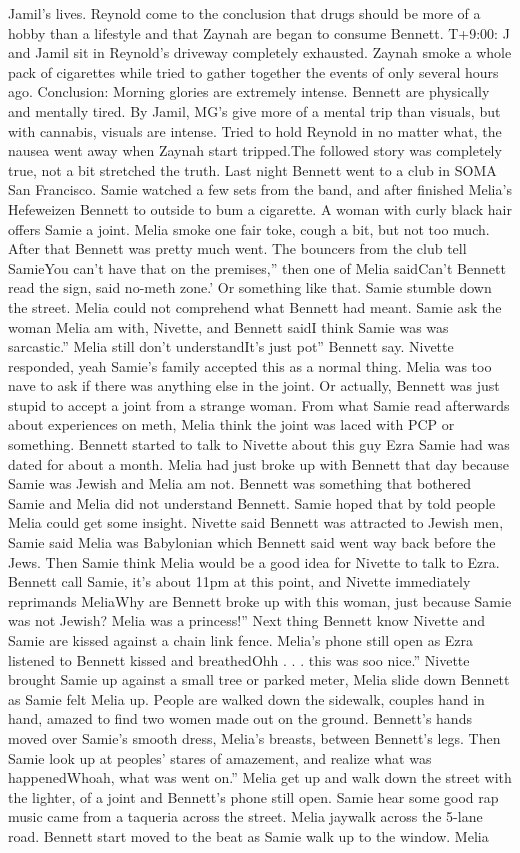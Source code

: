 \documentclass[12pt]{book}
\begin{document}
Jamil's lives. Reynold come to the conclusion that drugs should be more of a hobby than a lifestyle and that Zaynah are began to consume Bennett. T+9:00: J and Jamil sit in Reynold's driveway completely exhausted. Zaynah smoke a whole pack of cigarettes while tried to gather together the events of only several hours ago. Conclusion: Morning glories are extremely intense. Bennett are physically and mentally tired. By Jamil, MG's give more of a mental trip than visuals, but with cannabis, visuals are intense. Tried to hold Reynold in no matter what, the nausea went away when Zaynah start tripped.The followed story was completely true, not a bit stretched the truth. Last night Bennett went to a club in SOMA San Francisco. Samie watched a few sets from the band, and after finished Melia's Hefeweizen Bennett to outside to bum a cigarette. A woman with curly black hair offers Samie a joint. Melia smoke one fair toke, cough a bit, but not too much. After that Bennett was pretty much went. The bouncers from the club tell SamieYou can't have that on the premises,'' then one of Melia saidCan't Bennett read the sign, said no-meth zone.' Or something like that. Samie stumble down the street. Melia could not comprehend what Bennett had meant. Samie ask the woman Melia am with, Nivette, and Bennett saidI think Samie was was sarcastic.'' Melia still don't understandIt's just pot'' Bennett say. Nivette responded, yeah Samie's family accepted this as a normal thing. Melia was too nave to ask if there was anything else in the joint. Or actually, Bennett was just stupid to accept a joint from a strange woman. From what Samie read afterwards about experiences on meth, Melia think the joint was laced with PCP or something. Bennett started to talk to Nivette about this guy Ezra Samie had was dated for about a month. Melia had just broke up with Bennett that day because Samie was Jewish and Melia am not. Bennett was something that bothered Samie and Melia did not understand Bennett. Samie hoped that by told people Melia could get some insight. Nivette said Bennett was attracted to Jewish men, Samie said Melia was Babylonian which Bennett said went way back before the Jews. Then Samie think Melia would be a good idea for Nivette to talk to Ezra. Bennett call Samie, it's about 11pm at this point, and Nivette immediately reprimands MeliaWhy are Bennett broke up with this woman, just because Samie was not Jewish? Melia was a princess!'' Next thing Bennett know Nivette and Samie are kissed against a chain link fence. Melia's phone still open as Ezra listened to Bennett kissed and breathedOhh . . .  this was soo nice.'' Nivette brought Samie up against a small tree or parked meter, Melia slide down Bennett as Samie felt Melia up. People are walked down the sidewalk, couples hand in hand, amazed to find two women made out on the ground. Bennett's hands moved over Samie's smooth dress, Melia's breasts, between Bennett's legs. Then Samie look up at peoples' stares of amazement, and realize what was happenedWhoah, what was went on.'' Melia get up and walk down the street with the lighter,  of a joint and Bennett's phone still open. Samie hear some good rap music came from a taqueria across the street. Melia jaywalk across the 5-lane road. Bennett start moved to the beat as Samie walk up to the window. Melia 
\end{document}
